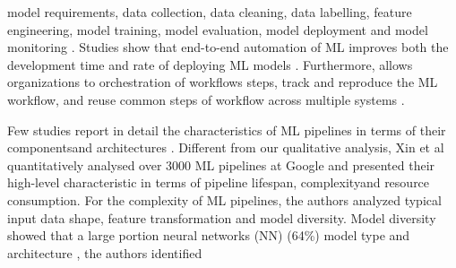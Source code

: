 \DIFdelbegin {}\DIFdelend \DIFaddbegin {}\DIFaddend model requirements, data collection, data cleaning, data labelling, feature engineering, model training, model evaluation, model deployment and model monitoring \cite{Amershi2019}. Studies show that end-to-end automation of ML \DIFdelbegin {}\DIFdelend \DIFaddbegin {}\DIFaddend improves both the development time and rate of deploying ML models \cite{Hummer2019IBM,Doris2021MLPipelines}. Furthermore, \DIFdelbegin {}\DIFdelend \DIFaddbegin {}\DIFaddend allows organizations to \DIFdelbegin {}\DIFdelend \DIFaddbegin {}\DIFaddend orchestration of workflows steps, \DIFdelbegin {}\DIFdelend track and reproduce the \DIFdelbegin {}\DIFdelend \DIFaddbegin {}\DIFaddend ML workflow, and \DIFdelbegin {}\DIFdelend reuse common steps of \DIFdelbegin {}\DIFdelend \DIFaddbegin {}\DIFaddend workflow across multiple \DIFdelbegin {}\DIFdelend \DIFaddbegin {}\DIFaddend systems \cite{Baylor2017, Hummer2019IBM}. %

Few studies report in detail the characteristics of ML pipelines \DIFdelbegin \DIFdel{, }\DIFdelend in terms of their components\DIFaddbegin \DIFadd{, }\DIFaddend and architectures \cite{Hummer2019IBM,Doris2021MLPipelines}. Different from our qualitative analysis, Xin et al \cite{Doris2021MLPipelines} quantitatively analysed over 3000 ML pipelines at Google and presented their high-level characteristic in terms of pipeline lifespan, complexity\DIFaddbegin \DIFadd{, }\DIFaddend and resource consumption. For the complexity of ML pipelines, the authors analyzed typical input data shape, feature transformation and model diversity. Model diversity showed that a large portion \DIFdelbegin {}\DIFdelend \DIFaddbegin {}\DIFaddend neural networks (NN) (64\%) \DIFdelbegin {}\DIFdelend \DIFaddbegin {}\DIFaddend model type and architecture \DIFdelbegin {}\DIFdelend \DIFaddbegin {}\DIFaddend , the authors \cite{Doris2021MLPipelines} identified \DIFdelbegin {}\DIFdelend \DIFaddbegin {}\DIFaddend 

